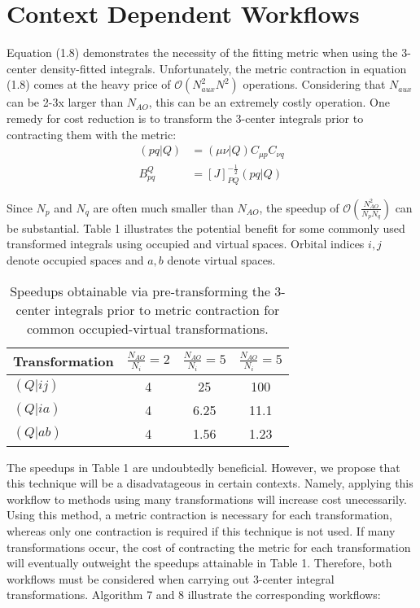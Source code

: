 \section{Context Dependent Workflows}

Equation (1.8) demonstrates the necessity of the fitting metric when using the 3-center density-fitted integrals. Unfortunately, the
metric contraction in equation (1.8) comes at the heavy price of $\mathcal{O}(N_{aux}^2N^2)$ operations.
Considering that $N_{aux}$ can be 2-3x larger
than $N_{AO}$, this can be an extremely costly operation. One remedy for cost reduction is to transform the 3-center integrals prior to contracting
them with the metric:
\begin{align} 
(p q | Q) &= (\mu \nu | Q) C_{\mu p}C_{\nu q} \\
B_{pq}^Q &= [J]_{PQ}^{-\frac{1}{2}}(pq | Q)  
\end{align}
 
\noindent Since $N_p$ and $N_q$ are often much smaller than $N_{AO}$, the speedup of 
$\mathcal{O}(\frac{N_{AO}^2}{N_pN_q})$ can be substantial. 
Table 1 illustrates the potential benefit for some commonly used transformed integrals using occupied and virtual spaces.
Orbital indices $i,j$ denote occupied spaces and $a,b$ denote virtual spaces.

\begingroup
\begin{table}[H]
\centering
\renewcommand{\baselinestretch}{1}
\caption{Speedups obtainable via pre-transforming the 3-center integrals prior to metric contraction for common occupied-virtual transformations.}
\begin{tabular}{l c c c}
\multicolumn{1}{l}{\textbf{Transformation}} &
\multicolumn{1}{c}{\textbf{$\frac{N_{AO}}{N_i}=2$}} & 
\multicolumn{1}{c}{\textbf{$\frac{N_{AO}}{N_i}=5$}} & 
\multicolumn{1}{c}{\textbf{$\frac{N_{AO}}{N_i}=5$}} \\ 
\hline
$(Q|ij)$       & 4               & 25              & 100      \\ 
$(Q|ia)$       & 4               & 6.25            & 11.1     \\ 
$(Q|ab)$        & 4              & 1.56            & 1.23     \\
\end{tabular}
\end{table}
\endgroup

The speedups in Table 1 are undoubtedly beneficial. However, we propose that this technique 
will be a disadvatageous in certain contexts. 
Namely, applying this workflow to methods using many transformations will increase cost unecessarily. 
Using this method, a metric contraction is necessary for each transformation, whereas only one contraction is required if this technique is not used.
If many transformations occur, the cost of contracting the metric for 
each transformation will eventually outweight the speedups attainable in Table 1. Therefore, both workflows must be considered when carrying
out 3-center integral transformations. Algorithm 7 and 8 illustrate the corresponding workflows:

